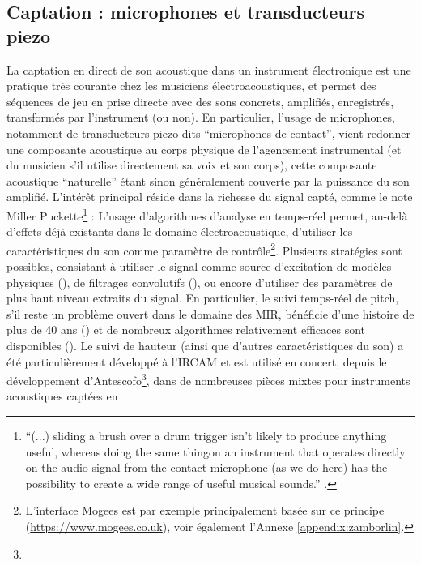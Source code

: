 
\subsection{Captation : microphones et transducteurs piezo}

\noindent La captation en direct de son acoustique dans un instrument électronique est une pratique très courante chez les musiciens électroacoustiques, et permet des séquences de jeu en prise directe avec des sons concrets, amplifiés, enregistrés, transformés par l'instrument (ou non). En particulier, l'usage de microphones, notamment de transducteurs piezo dits ``microphones de contact'', vient redonner une composante acoustique au corps physique de l'agencement instrumental (et du musicien s'il utilise directement sa voix et son corps), cette composante acoustique ``naturelle'' étant sinon généralement couverte par la puissance du son amplifié. L'intérêt principal réside dans la richesse du signal capté, comme le note Miller Puckette\footnote{``(...) sliding a brush over a drum trigger isn’t likely to produce  anything  useful,  whereas  doing  the  same  thingon an instrument that operates directly on the audio signal from the contact microphone (as we do here) has the possibility to create a wide range of useful musical sounds.'' \cite{puckette_infuriating_2011}.} :  L'usage d'algorithmes d'analyse en temps-réel permet, au-delà d'effets déjà existants dans le domaine électroacoustique, d'utiliser les caractéristiques du son comme paramètre de contrôle\footnote{L'interface Mogees est par exemple principalement basée sur ce principe (\url{https://www.mogees.co.uk}), voir également l'Annexe \ref{appendix:zamborlin}.}. Plusieurs stratégies sont possibles, consistant à utiliser le signal comme source d'excitation de modèles physiques (\cite{momeni_composing_2005, schlessinger_kalichord_2009, mehes_virtual-acoustic_2017, williams_pitch_2017, robertson_harmonic_2018}), de filtrages convolutifs (\cite{schwarz_rich_2014}), ou encore d'utiliser des paramètres de plus haut niveau extraits du signal. En particulier, le suivi temps-réel de pitch, s'il reste un problème ouvert dans le domaine des \gls{MIR}, bénéficie d'une histoire de plus de 40 ans (\cite{noll_cepstrum_1967}) et de nombreux algorithmes relativement efficaces sont disponibles (\cite{boersma_accurate_1993, de_cheveigne_yin_2002,pardue_low-cost_2015, schramm_polyphonic_2018}). Le suivi de hauteur (ainsi que d'autres caractéristiques du son) a été particulièrement développé à l'\gls{IRCAM} et est utilisé en concert, depuis le développement d'Antescofo\footnote{}, dans de nombreuses pièces mixtes pour instruments acoustiques captées en 